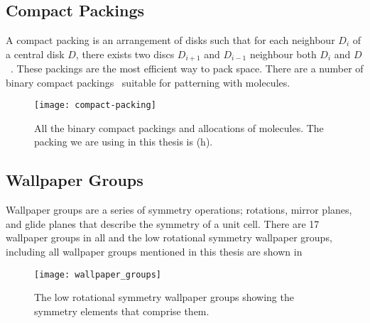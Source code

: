 \appendix

\chapter{}

\section{Compact Packings}
\label{sec:compact}

A compact packing is an arrangement of disks such that for each neighbour $D_i$ of a central disk $D$, there exists two discs $D_{i+1}$ and $D_{i-1}$ neighbour both $D_i$ and $D$~\cite{heppes:03,kennedy:06}. These packings are the most efficient way to pack space. There are a number of binary compact packings~ suitable for patterning with molecules.
\begin{figure}[htb]
    \texttt{[image: compact-packing]}
    \caption{All the binary compact packings and allocations of molecules. The packing we are using in this thesis is (h).}
    \label{fig:compact packing}
\end{figure}

\vspace{-3em}
\section{Wallpaper Groups}
\label{sec:wallpaper}

Wallpaper groups are a series of symmetry operations; rotations, mirror planes, and glide planes that describe the symmetry of a unit cell. There are 17 wallpaper groups in all and the low rotational symmetry wallpaper groups, including all wallpaper groups mentioned in this thesis are shown in 
\begin{figure}[hbt]
    \centering
    \texttt{[image: wallpaper\_groups]}
    \caption{The low rotational symmetry wallpaper groups showing the symmetry elements that comprise them.}
    \label{fig:wallpaper}
\end{figure}

